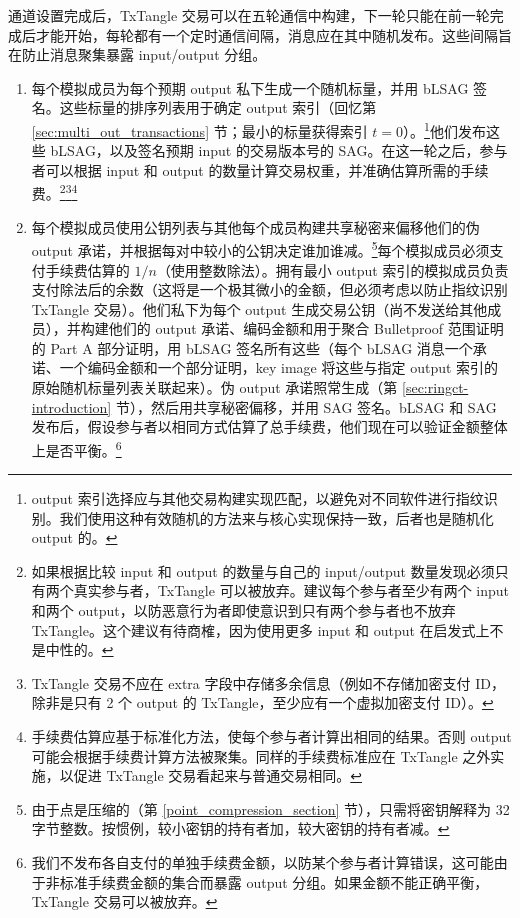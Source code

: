 通道设置完成后，TxTangle 交易可以在五轮通信中构建，下一轮只能在前一轮完成后才能开始，每轮都有一个定时通信间隔，消息应在其中随机发布。这些间隔旨在防止消息聚集暴露 input/output 分组。

\begin{enumerate}
    \item 每个模拟成员为每个预期 output 私下生成一个随机标量，并用 bLSAG 签名。这些标量的排序列表用于确定 output 索引（回忆第 \ref{sec:multi_out_transactions} 节；最小的标量获得索引 $t = 0$）。\footnote{output 索引选择应与其他交易构建实现匹配，以避免对不同软件进行指纹识别。我们使用这种有效随机的方法来与核心实现保持一致，后者也是随机化 output 的。}他们发布这些 bLSAG，以及签名预期 input 的交易版本号的 SAG。在这一轮之后，参与者可以根据 input 和 output 的数量计算交易权重，并准确估算所需的手续费。\footnote{如果根据比较 input 和 output 的数量与自己的 input/output 数量发现必须只有两个真实参与者，TxTangle 可以被放弃。建议每个参与者至少有两个 input 和两个 output，以防恶意行为者即使意识到只有两个参与者也不放弃 TxTangle。这个建议有待商榷，因为使用更多 input 和 output 在启发式上不是中性的。}\footnote{TxTangle 交易不应在 extra 字段中存储多余信息（例如不存储加密支付 ID，除非是只有 2 个 output 的 TxTangle，至少应有一个虚拟加密支付 ID）。}\footnote{手续费估算应基于标准化方法，使每个参与者计算出相同的结果。否则 output 可能会根据手续费计算方法被聚集。同样的手续费标准应在 TxTangle 之外实施，以促进 TxTangle 交易看起来与普通交易相同。}

    \item 每个模拟成员使用公钥列表与其他每个成员构建共享秘密来偏移他们的伪 output 承诺，并根据每对中较小的公钥决定谁加谁减。\footnote{由于点是压缩的（第 \ref{point_compression_section} 节），只需将密钥解释为 32 字节整数。按惯例，较小密钥的持有者加，较大密钥的持有者减。}每个模拟成员必须支付手续费估算的 $1/n$（使用整数除法）。拥有最小 output 索引的模拟成员负责支付除法后的余数（这将是一个极其微小的金额，但必须考虑以防止指纹识别 TxTangle 交易）。他们私下为每个 output 生成交易公钥（尚不发送给其他成员），并构建他们的 output 承诺、编码金额和用于聚合 Bulletproof 范围证明的 Part A 部分证明，用 bLSAG 签名所有这些（每个 bLSAG 消息一个承诺、一个编码金额和一个部分证明，key image 将这些与指定 output 索引的原始随机标量列表关联起来）。伪 output 承诺照常生成（第 \ref{sec:ringct-introduction} 节），然后用共享秘密偏移，并用 SAG 签名。bLSAG 和 SAG 发布后，假设参与者以相同方式估算了总手续费，他们现在可以验证金额整体上是否平衡。\footnote{我们不发布各自支付的单独手续费金额，以防某个参与者计算错误，这可能由于非标准手续费金额的集合而暴露 output 分组。如果金额不能正确平衡，TxTangle 交易可以被放弃。}


\end{enumerate}
